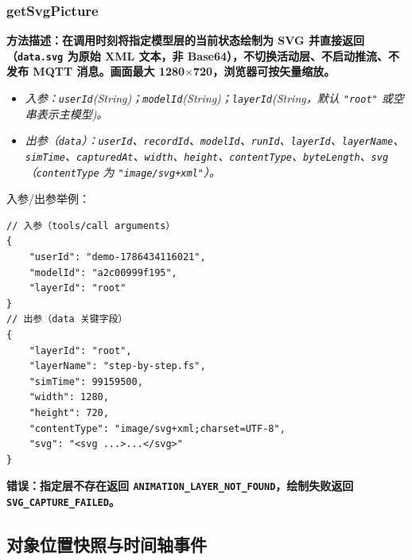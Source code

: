 \subsubsection{getSvgPicture}
\bf{方法描述}：在调用时刻将指定模型层的当前状态绘制为 SVG 并直接返回（\texttt{data.svg} 为原始 XML 文本，非 Base64），不切换活动层、不启动推流、不发布 MQTT 消息。画面最大 1280$\times$720，浏览器可按矢量缩放。
\begin{itemize}
	\item \it{入参}：\texttt{userId}(String)；\texttt{modelId}(String)；\texttt{layerId}(String，默认 \texttt{"root"} 或空串表示主模型)。
	\item \it{出参}（\texttt{data}）：\texttt{userId}、\texttt{recordId}、\texttt{modelId}、\texttt{runId}、\texttt{layerId}、\texttt{layerName}、\texttt{simTime}、\texttt{capturedAt}、\texttt{width}、\texttt{height}、\texttt{contentType}、\texttt{byteLength}、\texttt{svg}（\texttt{contentType} 为 \texttt{"image/svg+xml"}）。
\end{itemize}
入参/出参举例：
\begin{lstlisting}
// 入参（tools/call arguments）
{
    "userId": "demo-1786434116021",
    "modelId": "a2c00999f195",
    "layerId": "root"
}
// 出参（data 关键字段）
{
    "layerId": "root",
    "layerName": "step-by-step.fs",
    "simTime": 99159500,
    "width": 1280,
    "height": 720,
    "contentType": "image/svg+xml;charset=UTF-8",
    "svg": "<svg ...>...</svg>"
}
\end{lstlisting}\vspace{-30pt}
\bf{错误}：指定层不存在返回 \texttt{ANIMATION\_LAYER\_NOT\_FOUND}，绘制失败返回 \texttt{SVG\_CAPTURE\_FAILED}。

\subsection{对象位置快照与时间轴事件}
